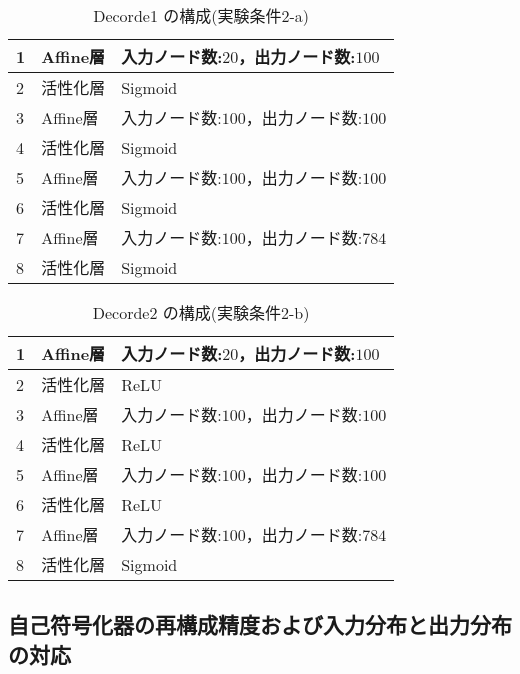 \documentclass[12pt]{jsarticle}
\begin{document}
\begin{table}[hbt]
\begin{center}
\caption{Decorde1 の構成(実験条件2-a)}
\label{table:Decorder}
\begin{tabularx}{0.9\linewidth}{|l|l|X|}
\hline
1 & Affine層 & 入力ノード数:$20$，出力ノード数:$100$ \\
\hline
2 & 活性化層 & Sigmoid \\
\hline
3 & Affine層 & 入力ノード数:$100$，出力ノード数:$100$ \\
\hline
4 & 活性化層 & Sigmoid \\
\hline
5 & Affine層 & 入力ノード数:$100$，出力ノード数:$100$ \\
\hline
6 & 活性化層 & Sigmoid \\
\hline
7 & Affine層 & 入力ノード数:$100$，出力ノード数:$784$ \\
\hline
8 & 活性化層 & Sigmoid \\
\hline

\end{tabularx}
\end{center}
\end{table}
\clearpage

\begin{table}[hbt]
\begin{center}
\caption{Decorde2 の構成(実験条件2-b)}
\label{table:Decorder}
\begin{tabularx}{0.9\linewidth}{|l|l|X|}
  \hline
  1 & Affine層 & 入力ノード数:$20$，出力ノード数:$100$ \\
  \hline
  2 & 活性化層 & ReLU \\
  \hline
  3 & Affine層 & 入力ノード数:$100$，出力ノード数:$100$ \\
  \hline
  4 & 活性化層 & ReLU \\
  \hline
  5 & Affine層 & 入力ノード数:$100$，出力ノード数:$100$ \\
  \hline
  6 & 活性化層 & ReLU \\
  \hline
  7 & Affine層 & 入力ノード数:$100$，出力ノード数:$784$ \\
  \hline
  8 & 活性化層 & Sigmoid \\
  \hline
\end{tabularx}
\end{center}
\end{table}





\subsection{自己符号化器の再構成精度および入力分布と出力分布の対応}
\end{document}
